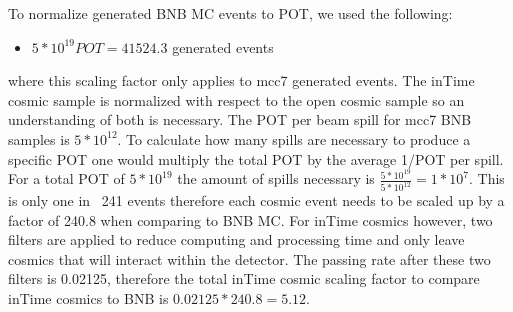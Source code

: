 To normalize generated BNB MC events to POT, we used the following:
\begin{itemize}
\item{ $5 * 10^{19} POT = 41524.3$ generated events}
\end{itemize}
where this scaling factor only applies to mcc7 generated events. The inTime cosmic sample is normalized with respect to the open cosmic sample so an understanding of both is necessary. The POT per beam spill for mcc7 BNB samples is $5 * 10^{12}$. To calculate how many spills are necessary to produce a specific POT one would multiply the total POT by the average 1/POT per spill. For a total POT of $5 * 10^{19}$ the amount of spills necessary is $\frac{5 * 10^{19}}{5 * 10^{12}} = 1 * 10^7$. This is only one in ~241 events therefore each cosmic event needs to be scaled up by a factor of 240.8 when comparing to BNB MC. For inTime cosmics however, two filters are applied to reduce computing and processing time and only leave cosmics that will interact within the detector. The passing rate after these two filters is 0.02125, therefore the total inTime cosmic scaling factor to compare inTime cosmics to BNB is $0.02125 * 240.8 = 5.12$.

